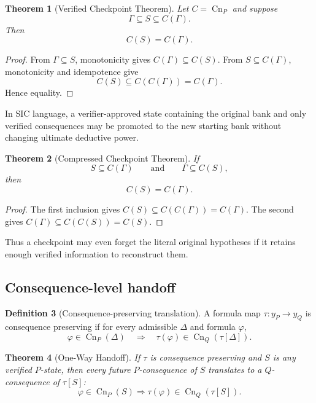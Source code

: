 \documentclass[11pt]{article}
\newtheorem{theorem}{Theorem}[section]
\theoremstyle{definition}
\newtheorem{definition}[theorem]{Definition}
\theoremstyle{remark}
\newcommand{\Cn}{\operatorname{Cn}}
\begin{document}
\begin{theorem}[Verified Checkpoint Theorem]\label{thm:checkpoint}
Let $C=\Cn_P$ and suppose
\[
\Gamma\subseteq S\subseteq C(\Gamma).
\]
Then
\[
C(S)=C(\Gamma).
\]
\end{theorem}

\begin{proof}
From $\Gamma\subseteq S$, monotonicity gives $C(\Gamma)\subseteq C(S)$. From $S\subseteq C(\Gamma)$, monotonicity and idempotence give
\[
C(S)\subseteq C(C(\Gamma))=C(\Gamma).
\]
Hence equality.
\end{proof}

In SIC language, a verifier-approved state containing the original bank and only verified consequences may be promoted to the new starting bank without changing ultimate deductive power.

\begin{theorem}[Compressed Checkpoint Theorem]\label{thm:compressed}
If
\[
S\subseteq C(\Gamma)
\qquad\text{and}\qquad
\Gamma\subseteq C(S),
\]
then
\[
C(S)=C(\Gamma).
\]
\end{theorem}

\begin{proof}
The first inclusion gives $C(S)\subseteq C(C(\Gamma))=C(\Gamma)$. The second gives $C(\Gamma)\subseteq C(C(S))=C(S)$.
\end{proof}

Thus a checkpoint may even forget the literal original hypotheses if it retains enough verified information to reconstruct them.

\subsection{Consequence-level handoff}
\begin{definition}[Consequence-preserving translation]
A formula map $\tau:y_P\to y_Q$ is consequence preserving if for every admissible $\Delta$ and formula $\varphi$,
\[
\varphi\in\Cn_P(\Delta)
\quad\Longrightarrow\quad
\tau(\varphi)\in\Cn_Q(\tau[\Delta]).
\]
\end{definition}

\begin{theorem}[One-Way Handoff]
If $\tau$ is consequence preserving and $S$ is any verified $P$-state, then every future $P$-consequence of $S$ translates to a $Q$-consequence of $\tau[S]$:
\[
\varphi\in\Cn_P(S)\Longrightarrow\tau(\varphi)\in\Cn_Q(\tau[S]).
\]
\end{theorem}
\end{document}
